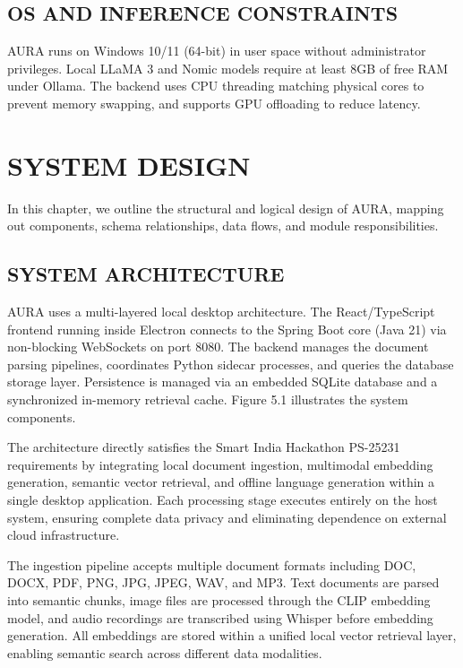 \documentclass[12pt,a4paper]{report}
\begin{document}
\section{OS AND INFERENCE CONSTRAINTS}
AURA runs on Windows 10/11 (64-bit) in user space without administrator privileges. Local LLaMA 3 and Nomic models require at least 8GB of free RAM under Ollama. The backend uses CPU threading matching physical cores to prevent memory swapping, and supports GPU offloading to reduce latency.

\chapter{SYSTEM DESIGN}
\label{ch:system_design}

In this chapter, we outline the structural and logical design of AURA, mapping out components, schema relationships, data flows, and module responsibilities.

\section{SYSTEM ARCHITECTURE}
AURA uses a multi-layered local desktop architecture. The React/TypeScript frontend running inside Electron connects to the Spring Boot core (Java 21) via non-blocking WebSockets on port 8080. The backend manages the document parsing pipelines, coordinates Python sidecar processes, and queries the database storage layer. Persistence is managed via an embedded SQLite database and a synchronized in-memory retrieval cache. Figure 5.1 illustrates the system components.

The architecture directly satisfies the Smart India Hackathon PS-25231 requirements by integrating local document ingestion, multimodal embedding generation, semantic vector retrieval, and offline language generation within a single desktop application. Each processing stage executes entirely on the host system, ensuring complete data privacy and eliminating dependence on external cloud infrastructure.

The ingestion pipeline accepts multiple document formats including DOC, DOCX, PDF, PNG, JPG, JPEG, WAV, and MP3. Text documents are parsed into semantic chunks, image files are processed through the CLIP embedding model, and audio recordings are transcribed using Whisper before embedding generation. All embeddings are stored within a unified local vector retrieval layer, enabling semantic search across different data modalities.
\end{document}
